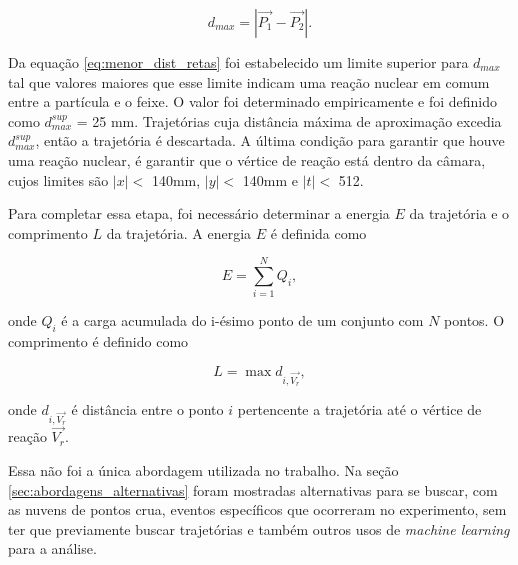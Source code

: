 \documentclass[a4paper,12pt,oneside]{book}
\begin{document}
\begin{equation} \label{eq:menor_dist_retas}
    d_{max} = \left | \vec{P_1} - \vec{P_2} \right |.
\end{equation}


\par Da equação \ref{eq:menor_dist_retas} foi estabelecido um limite superior para $d_{max}$ tal que valores maiores que esse limite indicam uma reação nuclear em comum entre a partícula e o feixe. O valor foi determinado empiricamente e foi definido como $d_{max}^{sup}$ = 25 mm. Trajetórias cuja distância máxima de aproximação excedia $d_{max}^{sup}$, então a trajetória é descartada. A última condição para garantir que houve uma reação nuclear, é garantir que o vértice de reação está dentro da câmara, cujos limites são $|x| < $ 140mm, $|y| < $ 140mm e $|t| < $ 512.

\par Para completar essa etapa, foi necessário determinar a energia $E$ da trajetória e o comprimento $L$ da trajetória. A energia $E$ é definida como

\begin{equation}\label{eq:carga_acumulada}
	E = \sum_{i = 1}^{N} Q_i,
\end{equation}

\par onde $Q_i$ é a carga acumulada do i-ésimo ponto de um conjunto com $N$ pontos. O comprimento é definido como

\begin{equation}\label{eq:comprimento_trajetoria}
	L = \max{d_{i, \vec{V_r}}},
\end{equation}

\par onde $d_{i, \vec{V_r}}$ é distância entre o ponto $i$ pertencente a trajetória até o vértice de reação $\vec{V_r}$.

\par Essa não foi a única abordagem utilizada no trabalho. Na seção \ref{sec:abordagens_alternativas} foram mostradas alternativas para se buscar, com as nuvens de pontos crua, eventos específicos que ocorreram no experimento, sem ter que previamente buscar trajetórias e também outros usos de \textit{machine learning} para a análise.
\end{document}

